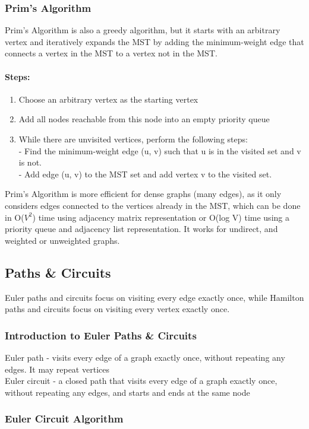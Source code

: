 \documentclass[10pt]{article}
\begin{document}
\subsubsection{Prim's Algorithm}
Prim's Algorithm is also a greedy algorithm, but it starts with an arbitrary vertex and iteratively expands the MST by adding the minimum-weight edge that connects a vertex in the MST to a vertex not in the MST.
\paragraph{Steps:}
\begin{enumerate}
    \item Choose an arbitrary vertex as the starting vertex
    \item Add all nodes reachable from this node into an empty priority queue
    \item While there are unvisited vertices, perform the following steps:
          \\ - Find the minimum-weight edge (u, v) such that u is in the visited set and v is not.
          \\ - Add edge (u, v) to the MST set and add vertex v to the visited set.
\end{enumerate}
Prim's Algorithm is more efficient for dense graphs (many edges), as it only considers edges connected to the vertices already in the MST, which can be done in O($V^2$) time using adjacency matrix representation or O(log V) time using a priority queue and adjacency list representation. It works for undirect, and weighted or unweighted graphs.

\subsection{Paths \& Circuits}
Euler paths and circuits focus on visiting every edge exactly once, while Hamilton paths and circuits focus on visiting every vertex exactly once.
\subsubsection{Introduction to Euler Paths \& Circuits}
Euler path -  visits every edge of a graph exactly once, without repeating any edges. It may repeat vertices \\
Euler circuit - a closed path that visits every edge of a graph exactly once, without repeating any edges, and starts and ends at the same node
\subsubsection{Euler Circuit Algorithm}
\end{document}
